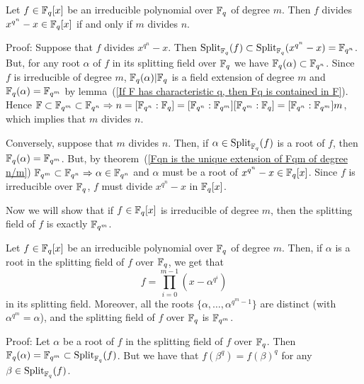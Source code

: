 \begin{dang}
    \begin{lemma}\label{f irreducible divides xqn-x iff d(f) divides n}
        Let $f\in\mathbb{F}_q[x]$ be an irreducible polynomial over $\mathbb{F}_q$ of degree $m$. Then $f$ divides $x^{q^n}-x\in\mathbb{F}_q[x]$ if and only if $m$ divides $n$.
    \end{lemma}
\end{dang}
Proof: Suppose that $f$ divides $x^{q^n}-x$. Then $\text{Split}_{\mathbb{F}_q}(f)\subset\text{Split}_{\mathbb{F}_q}(x^{q^n}-x)=\mathbb{F}_{q^n}$. But, for any root $\alpha$ of $f$ in its splitting field over $\mathbb{F}_q$ we have $\mathbb{F}_q(\alpha)\subset \mathbb{F}_{q^n}$. Since $f$ is irreducible of degree $m$, $\mathbb{F}_q(\alpha)|\mathbb{F}_q$ is a field extension of degree $m$ and $\mathbb{F}_q(\alpha)=\mathbb{F}_{q^m}$ by lemma~(\ref{If F has characteristic q, then Fq is contained in F}). Hence $\mathbb{F}\subset \mathbb{F}_{q^m}\subset \mathbb{F}_{q^n}\Rightarrow n=[\mathbb{F}_{q^n}:\mathbb{F}_q]=[\mathbb{F}_{q^n}:\mathbb{F}_{q^m}][\mathbb{F}_{q^m}:\mathbb{F}_q]=[\mathbb{F}_{q^n}:\mathbb{F}_{q^m}]m$, which implies that $m$ divides $n$.\par
Conversely, suppose that $m$ divides $n$. Then, if $\alpha\in\text{Split}_{\mathbb{F}_q}(f)$ is a root of $f$, then $\mathbb{F}_q(\alpha)=\mathbb{F}_{q^m}$. But, by theorem~(\ref{Fqn is the unique extension of Fqm of degree n/m}) $\mathbb{F}_{q^m}\subset\mathbb{F}_{q^n}\Rightarrow \alpha\in\mathbb{F}_{q^n}$ and $\alpha$ must be a root of $x^{q^n}-x\in\mathbb{F}_q[x]$. Since $f$ is irreducible over $\mathbb{F}_q$, $f$ must divide $x^{q^n}-x$ in $\mathbb{F}_q[x]$.\par
Now we will show that if $f\in\mathbb{F}_q[x]$ is irreducible of degree $m$, then the splitting field of $f$ is exactly $\mathbb{F}_{q^m}$.
\begin{dang}
    \begin{theorem}\label{each irredcubible polynomial f gives an orbit of the Frobenius automorphism}
        Let $f\in\mathbb{F}_q[x]$ be an irreducible polynomial over $\mathbb{F}_q$ of degree $m$. Then, if $\alpha$ is a root in the splitting field of $f$ over $\mathbb{F}_q$, we get that  
        \begin{equation}
            f=\prod_{i=0}^{m-1}(x-\alpha^{q^i})
        \end{equation}
        in its splitting field. Moreover, all the roots $\{\alpha,\dots,\alpha^{q^m-1}\}$ are distinct (with $\alpha^{q^m}=\alpha$), and the splitting field of $f$ over $\mathbb{F}_q$ is $\mathbb{F}_{q^m}$.
    \end{theorem}
\end{dang}
Proof: Let $\alpha$ be a root of $f$ in the splitting field of $f$ over $\mathbb{F}_q$. Then $\mathbb{F}_q(\alpha)=\mathbb{F}_{q^m}\subset \text{Split}_{\mathbb{F}_q}(f)$. But we have that $f(\beta^q)=f(\beta)^q$ for any $\beta\in \text{Split}_{\mathbb{F}_q}(f)$.\par
